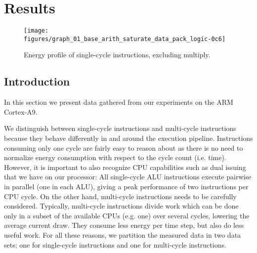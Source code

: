 \section{Results}

%
%
%
%

\begin{figure*}[ht]
    \centering
    \texttt{[image: figures/graph\_01\_base\_arith\_saturate\_data\_pack\_logic-0c6]}
    \caption{Energy profile of single-cycle instructions, excluding multiply.}
    \label{fig:singlecycle}
\end{figure*}


\subsection{Introduction}
In this section we present data gathered from our experiments on the ARM
Cortex-A9.

We distinguish between single-cycle instructions and multi-cycle instructions
because they behave differently in and around the execution pipeline.
Instructions consuming only one cycle are fairly easy to reason about as there
is no need to normalize energy consumption with respect to the cycle count (i.e.
time). However, it is important to also recognize CPU capabilities such as dual
issuing that we have on our processor: All single-cycle ALU instructions execute
pairwise in parallel (one in each ALU), giving a peak performance of two
instructions per CPU cycle. On the other hand, multi-cycle instructions needs to
be carefully considered. Typically, multi-cycle instructions divide work which
can be done only in a subset of the available CPUs (e.g. one) over several
cycles, lowering the average current draw. They consume less energy per
time step, but also do less useful work. For all these reasons, we partition the
measured data in two data sets; one for single-cycle instructions and one for
multi-cycle instructions.

